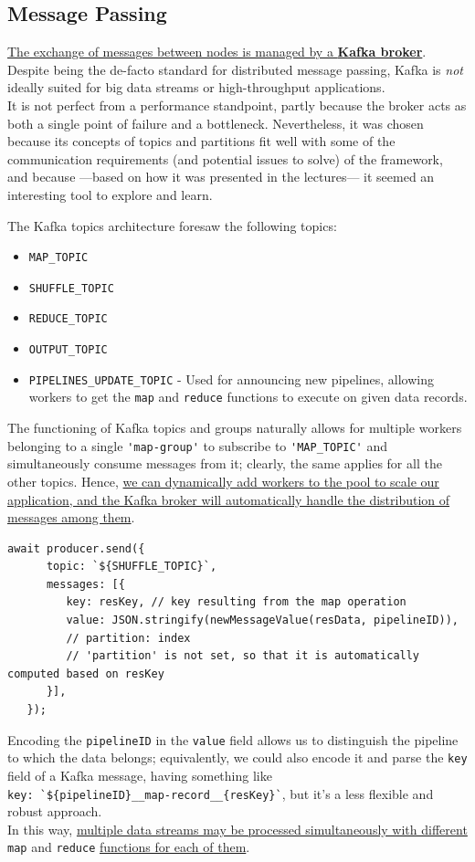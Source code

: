 \subsection{Message Passing}
\ul{The exchange of messages between nodes is managed by a \textbf{Kafka broker}}. 
Despite being the de-facto standard for distributed message passing, Kafka is \textit{not} ideally suited for big data streams or high-throughput applications.\\
It is not perfect from a performance standpoint, partly because the broker acts as both a single point of failure and a bottleneck. Nevertheless, it was chosen because its concepts of topics and partitions fit well with some of the communication requirements (and potential issues to solve) of the framework, and because ---based on how it was presented in the lectures--- it seemed an interesting tool to explore and learn.

{The Kafka topics architecture foresaw the following topics:\ns
\begin{itemize}
   \label{enum:simplerTopics}
   \item \verb|MAP_TOPIC|
   \item \verb|SHUFFLE_TOPIC|
   \item \verb|REDUCE_TOPIC|
   \item \verb|OUTPUT_TOPIC|
   \item \verb|PIPELINES_UPDATE_TOPIC| - Used for announcing new pipelines, allowing workers to get the \verb|map| and \verb|reduce| functions to execute on given data records.
\end{itemize}}

The functioning of Kafka topics and groups naturally allows for multiple workers belonging to a single \verb|'map-group'| to subscribe to \verb|'MAP_TOPIC'| and simultaneously consume messages from it; clearly, the same applies for all the other topics. 
Hence, \ul{we can dynamically add workers to the pool to scale our application, and the Kafka broker will automatically handle the distribution of messages among them}.

\begin{lstlisting}[caption={Sending MAP record to shuffle topic},label={lst:sendingMapRecord}]
   await producer.send({
      topic: `${SHUFFLE_TOPIC}`,
      messages: [{
         key: resKey, // key resulting from the map operation
         value: JSON.stringify(newMessageValue(resData, pipelineID)),
         // partition: index
         // 'partition' is not set, so that it is automatically computed based on resKey 
      }],
   });
\end{lstlisting}
Encoding the \verb|pipelineID| in the \verb|value| field allows us to distinguish the pipeline to which the data belongs; equivalently, we could also encode it and parse the \verb|key| field of a Kafka message, having something like \\ \verb|key: `${pipelineID}__map-record__{resKey}`|, but it's a less flexible and robust approach.\\
In this way, \ul{multiple data streams may be processed simultaneously with different} \verb|map| and \verb|reduce| \ul{functions for each of them}.


